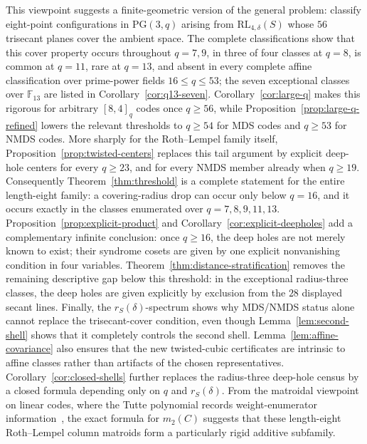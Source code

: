 ﻿\documentclass[11pt]{article}
\newcommand{\F}{\mathbb F}
\newcommand{\PG}{\mathrm{PG}}
\newcommand{\RL}{\mathrm{RL}}
\theoremstyle{plain}
\theoremstyle{definition}
\begin{document}
This viewpoint suggests a finite-geometric version of the general problem:
classify eight-point configurations in \(\PG(3,q)\) arising from
\(\RL_{4,\delta}(S)\) whose \(56\) trisecant planes cover the ambient space.
The complete classifications show that this cover property occurs throughout
\(q=7,9\), in three of four classes at \(q=8\), is common at \(q=11\), rare
at \(q=13\), and absent in every complete affine classification over
prime-power fields \(16\le q\le53\); the seven exceptional classes over
\(\F_{13}\) are listed in Corollary~\ref{cor:q13-seven}.
Corollary~\ref{cor:large-q} makes this rigorous for arbitrary \([8,4]_q\)
codes once \(q\ge56\), while Proposition~\ref{prop:large-q-refined} lowers
the relevant thresholds to \(q\ge54\) for MDS codes and \(q\ge53\) for NMDS
codes.  More sharply for the Roth--Lempel family itself,
Proposition~\ref{prop:twisted-centers} replaces this tail argument by
explicit deep-hole centers for every \(q\ge23\), and for every NMDS member
already when \(q\ge19\).  Consequently
Theorem~\ref{thm:threshold} is a complete statement for the entire
length-eight family: a covering-radius drop can occur only below \(q=16\),
and it occurs exactly in the classes enumerated over \(q=7,8,9,11,13\).
Proposition~\ref{prop:explicit-product} and
Corollary~\ref{cor:explicit-deepholes} add a complementary infinite
conclusion: once \(q\ge16\), the deep holes are not merely known to exist;
their syndrome cosets are given by one explicit nonvanishing condition in
four variables.
Theorem~\ref{thm:distance-stratification} removes the remaining descriptive
gap below this threshold: in the exceptional radius-three classes, the deep
holes are given explicitly by exclusion from the \(28\) displayed secant
lines.  Finally, the \(r_S(\delta)\)-spectrum shows why MDS/NMDS status alone
cannot replace the trisecant-cover condition, even though
Lemma~\ref{lem:second-shell} shows that it completely controls the
second shell.  Lemma~\ref{lem:affine-covariance} also ensures that
the new twisted-cubic certificates are intrinsic to affine classes rather
than artifacts of the chosen representatives.
Corollary~\ref{cor:closed-shells} further replaces the radius-three
deep-hole census by a closed formula depending only on \(q\) and
\(r_S(\delta)\).
From the matroidal viewpoint on linear codes, where the Tutte polynomial
records weight-enumerator information~\cite{Greene1976}, the exact formula
for \(m_2(C)\) suggests that these length-eight Roth--Lempel column matroids
form a particularly rigid additive subfamily.
\end{document}
